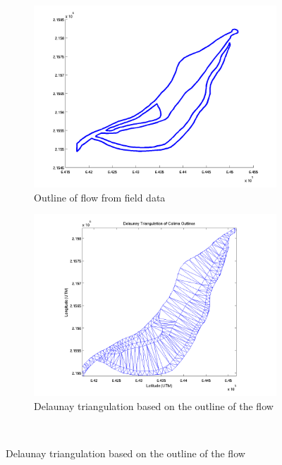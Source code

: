 \documentclass[letterpaper,10pt]{article}
\begin{document}
\begin{figure}
        \centering
        \begin{subfigure}[b]{0.45\textwidth}
                \includegraphics[width=\textwidth]{IMAGES/pics/outline.png}
                \caption{Outline of flow from field data}
                \label{fig:Outline}
        \end{subfigure}%
        \begin{subfigure}[b]{0.45\textwidth}
                \includegraphics[width=\textwidth]{IMAGES/pics/Delaunay_Triangulation_of_Colima_clean.png}
                \caption{Delaunay triangulation based on the outline of the flow}
                \label{fig:Delaunay}
        \end{subfigure}\\

\end{figure}
\end{document}
